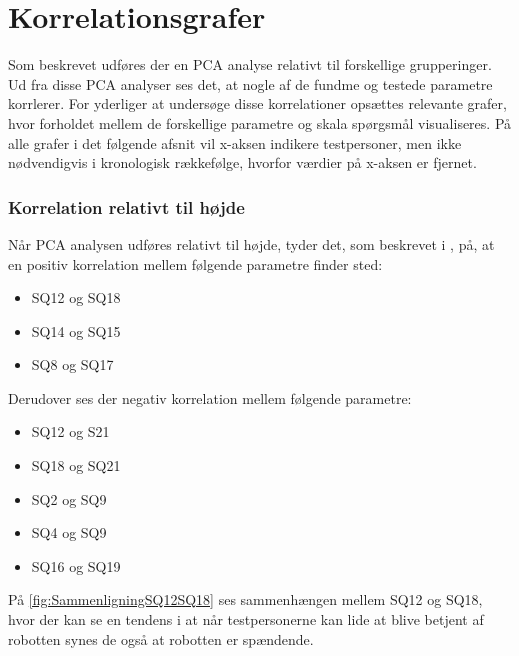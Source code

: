\section{Korrelationsgrafer}
\label{DatabehandlingKorrelationsgrafer}
%
Som beskrevet udføres der en PCA analyse relativt til forskellige grupperinger. Ud fra disse PCA analyser ses det, at nogle af de fundme og testede parametre korrlerer. For yderliger at undersøge disse korrelationer opsættes relevante grafer, hvor forholdet mellem de forskellige parametre og skala spørgsmål visualiseres. På alle grafer i det følgende afsnit vil x-aksen indikere testpersoner, men ikke nødvendigvis i kronologisk rækkefølge, hvorfor værdier på x-aksen er fjernet.

\subsubsection{Korrelation relativt til højde}
Når PCA analysen udføres relativt til højde, tyder det, som beskrevet i , på, at en positiv korrelation mellem følgende parametre finder sted:
\begin{itemize}
	\item SQ12 og SQ18
	\item SQ14 og SQ15
	\item SQ8 og SQ17
\end{itemize}
%
Derudover ses der negativ korrelation mellem følgende parametre:
\begin{itemize}
	\item SQ12 og S21
	\item SQ18 og SQ21
	\item SQ2 og SQ9
	\item SQ4 og SQ9
	\item SQ16 og SQ19
\end{itemize}
%
På \autoref{fig:SammenligningSQ12SQ18} ses sammenhængen mellem SQ12 og SQ18, hvor der kan se en tendens i at når testpersonerne kan lide at blive betjent af robotten synes de også at robotten er spændende. 
%
